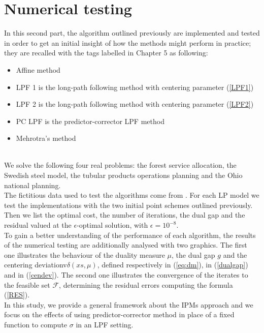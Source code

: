 \documentclass[a4paper,10 pt,titlepage,twoside]{book}
\theoremstyle{plain}
\theoremstyle{definition}
\theoremstyle{remark}
\begin{document}
{{\chapter{Numerical testing}
In this second part, the algorithm outlined previously are implemented and tested in order to get an initial insight of how the methods might
perform in practice; they are recalled with the tags labelled in Chapter 5 as following:
\begin{itemize}
	\item Affine method
	\item LPF 1 is the long-path following method with centering parameter (\ref{LPF1})
	\item LPF 2 is the long-path following method with centering parameter (\ref{LPF2})
	\item PC LPF is the predictor-corrector LPF method 
	\item Mehrotra's method
\end{itemize}\\ We solve the following four real problems: the forest service allocation, the Swedish steel model, the tubular products operations planning and the Ohio national planning.\\
The fictitious data used to test the algorithms come from \cite{RR}.
For each LP model we test the implementations with the two initial point schemes outlined previously. Then we list the optimal cost, the number of iterations, the dual gap and the residual valued at the $\epsilon$-optimal solution, with $\epsilon= 10^{-8}$.\\ To gain a better understanding of the performance of each algorithm, the results of the numerical testing are additionally analysed with two graphics. The first one illustrates the behaviour of the duality measure $\mu$, the dual gap $g$ and the centering deviationv$\delta(xs, \mu)$, defined respectively in (\ref{eq:dm}), in (\ref{dualgap}) and in (\ref{cendev}). The second one illustrates the convergence of the iterates to the feasible set $\mathcal{F}$, determining the residual errors computing the formula (\ref{RES}).\\
In this study, we provide a general framework about the IPMs approach and we focus on the effects of using predictor-corrector method in place of a fixed function to compute $\sigma$ in an LPF setting. 
}}
\end{document}
